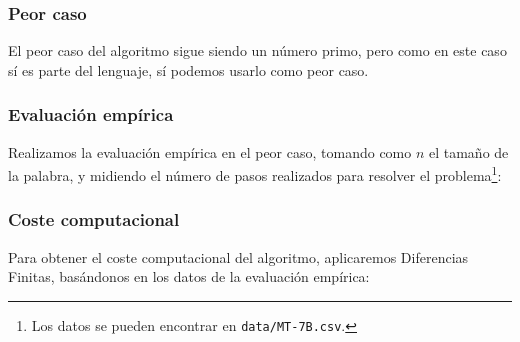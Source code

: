 

\subsubsection*{Peor caso}
El peor caso del algoritmo sigue siendo un número primo, pero como en este caso sí es parte del lenguaje, sí podemos usarlo como peor caso.


\subsubsection*{Evaluación empírica}
Realizamos la evaluación empírica en el peor caso, tomando como $n$ el tamaño de la palabra, y midiendo el número de pasos realizados para resolver el problema\footnote{Los datos se pueden encontrar en \texttt{data/MT-7B.csv}.}:



\subsubsection*{Coste computacional}
Para obtener el coste computacional del algoritmo, aplicaremos Diferencias Finitas, basándonos en los datos de la evaluación empírica:


